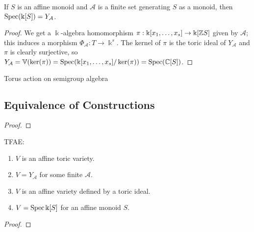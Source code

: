 \begin{proposition}
  \label{1-1-14-spec-aff-mon-alg-eq-ya}

  If $S$ is an affine monoid and $\mathcal A$ is a finite set generating $S$ as a monoid, then $\operatorname{Spec}(\Bbbk[S]) = Y_{\mathcal A}$.
\end{proposition}
\begin{proof}

  We get a $\Bbbk$-algebra homomorphism $\pi : \Bbbk[x_1, \dotsc, x_s] \to \Bbbk[{\mathbb Z} S]$ given by $\mathcal A$; this induces a morphism $\Phi_{\mathcal A} : T \to \Bbbk^s$. The kernel of $\pi$ is the toric ideal of $Y_{\mathcal A}$ and $\pi$ is clearly surjective, so $Y_{\mathcal A} = \mathbb V(\ker(\pi)) = \operatorname{Spec}(\Bbbk[x_1, \dotsc, x_s] / \ker(\pi)) = \operatorname{Spec}({\mathbb C}[S])$.
\end{proof}


\begin{definition}
  \label{torActOnAlg}
  Torus action on semigroup algebra
\end{definition}


\subsection{Equivalence of Constructions}


\begin{lemma}
  \label{lmm:1.1.16}
\end{lemma}
\begin{proof}

\end{proof}


\begin{theorem}
  \label{thm:1.1.17}
  TFAE:
  \begin{enumerate}
    \item $V$ is an affine toric variety.
    \item $V = Y_{\mathcal A}$ for some finite $\mathcal A$.
    \item $V$ is an affine variety defined by a toric ideal.
    \item $V = \operatorname{Spec} \Bbbk[S]$ for an affine monoid $S$.
  \end{enumerate}
\end{theorem}
\begin{proof}

\end{proof}
